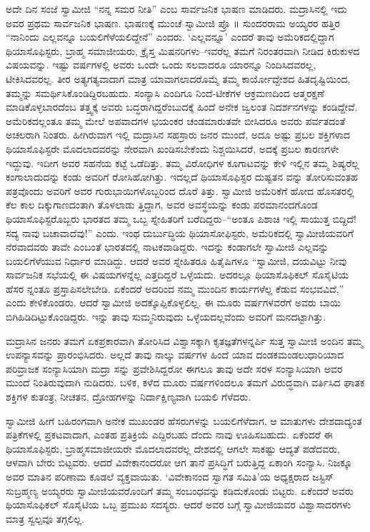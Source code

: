 ಅದೇ ದಿನ ಸಂಜೆ ಸ್ವಾಮೀಜಿ “ನನ್ನ ಸಮರ ನೀತಿ” ಎಂಬ ಸಾರ್ವಜನಿಕ ಭಾಷಣ ಮಾಡಿದರು. ಮದ್ರಾಸಿನಲ್ಲಿ ಇದು ಅವರ ಪ್ರಥಮ ಸಾರ್ವಜನಿಕ ಭಾಷಣ. ಭಾಷಣಕ್ಕೆ ಮುಂಚೆ ಸ್ವಾಮೀಜಿ ಪ್ರೊ ॥ ಸುಂದರರಾಮ ಅಯ್ಯರರ ಹತ್ತಿರ “ನಾನಿಂದು ಎಲ್ಲವನ್ನೂ ಬಯಲಿಗೆಳೆಯಲಿದ್ದೇನೆ” ಎಂದರು. ‘ಎಲ್ಲವನ್ನೂ’ ಎಂದರೆ ತಾವು ಅಮೆರಿಕದಲ್ಲಿದ್ದಾಗ ಥಿಯಾಸೊಫಿಸ್ಟರು, ಬ್ರಾಹ್ಮ ಸಮಾಜೀಯರು, ಕ್ರೈಸ್ತ ಮಿಷನರಿಗಳು–ಇವರೆಲ್ಲ ತಮಗೆ ನಿರಂತರವಾಗಿ ನೀಡಿದ ಕಿರುಕುಳದ ವಿಷಯವನ್ನು. ಇಷ್ಟು ವರ್ಷಗಳಲ್ಲಿ ಅವರು ಒಂದೇ ಒಂದು ಸಲವಾದರೂ ಯಾರನ್ನೂ ನಿಂದಿಸಿದವರಲ್ಲ, ಟೀಕಿಸಿದವರಲ್ಲ. ತೀರ ಅತ್ಯಗತ್ಯವಾದಾಗ ಮಾತ್ರ ಯಾವಾಗಲಾದರೊಮ್ಮೆ ತಮ್ಮ ಕಾರ್ಯೋದ್ದೇಶದ ಹಿತದೃಷ್ಟಿಯಿಂದ, ತಮ್ಮನ್ನು ಸಮರ್ಥಿಸಿಕೊಂಡಿದ್ದಿರಬಹುದು. ಸಂನ್ಯಾಸಿ ಎಂದಿಗೂ ನಿಂದೆ-ಟೀಕೆಗಳ ಆಕ್ರಮಣದಿಂದ ಆತ್ಮರಕ್ಷಣೆ ಮಾಡಿಕೊಳ್ಳಬಾರದೆಂಬ ತತ್ತ್ವಕ್ಕೆ ಅವರು ಬದ್ಧರಾಗಿದ್ದರೆಂಬುದಕ್ಕೆ ಹಿಂದೆ ಅನೇಕ ಜ್ವಲಂತ ನಿದರ್ಶನಗಳನ್ನು ಕಂಡಿದ್ದೇವೆ. ಅಮೆರಿಕದಲ್ಲಂತೂ ತಮ್ಮ ಮೇಲೆ ಅಪವಾದಗಳ ಭಯಂಕರ ಚಂಡಮಾರುತವೇ ಬೀಸಿದರೂ ಅವರು ಪರ್ವತದಂತೆ ಅಚಲರಾಗಿ ನಿಂತರು. ಹೀಗಿರುವಾಗ ಇಲ್ಲಿ ಮದ್ರಾಸಿನ ಸಹಸ್ರಾರು ಜನರ ಮುಂದೆ, ಅದೂ ಅಷ್ಟು ಪ್ರಬಲ ಶಕ್ತಿಗಳಾದ ಥಿಯಾಸೊಫಿಸ್ಟರೇ ಮೊದಲಾದವರನ್ನು ನೇರವಾಗಿ ಖಂಡಿಸಬೇಕೆಂದು ನಿಶ್ಚಯಿಸಿದರೆ, ಅದಕ್ಕೆ ಪ್ರಬಲ ಕಾರಣಗಳೇ ಇದ್ದುವು. ಇದೀಗ ಅವರ ಸಹನೆಯ ಕಟ್ಟೆ ಒಡೆದಿತ್ತು. ತಮ್ಮ ವಿರೋಧಿಗಳ ಕೂಗಾಟವನ್ನು ಕೇಳಿ ಇಲ್ಲಿನ ತಮ್ಮ ಶಿಷ್ಯರೆಲ್ಲ ಕಂಗಾಲಾದುದನ್ನು ಕಂಡು ಅವರಿಗೆ ರೋಸಿಹೋಗಿತ್ತು. ಇದಲ್ಲದೆ ಥಿಯಾಸೊಫಿಸ್ಟರ ದುಷ್ಟತನ ವನ್ನು ತೋರಿಸುವಂತಹ ಪತ್ರವೊಂದು ಅವರಿಗೆ ಅವರ ಗುರುಭಾಯಿಗಳೊಬ್ಬರಿಂದ ದೊರೆ ತಿತ್ತು. ಸ್ವಾಮೀಜಿ ಅಮೆರಿಕೆಗೆ ಹೋದ ಹೊಸತರಲ್ಲಿ ಕೆಲ ಕಾಲ ದಿಕ್ಕುಗಾಣದಂತಾಗಿ ತೊಳಲಾಡು ತ್ತಿದ್ದಾಗ, ಅವರ ಅವಸ್ಥೆಯನ್ನು ಕಂಡು ಪರಮಾನಂದಗೊಂಡ ಥಿಯಾಸೊಫಿಸ್ಟರೊಬ್ಬರು ಭಾರತದ ತಮ್ಮ ಒಬ್ಬ ಸ್ನೇಹಿತರಿಗೆ ಬರೆದಿದ್ದರು–“ಅಂತೂ ಪಿಶಾಚಿ ಇಲ್ಲಿ ಸಾಯುತ್ತ ಬಿದ್ದಿದೆ! ಸದ್ಯ ನಾವು ಬಚಾವಾದೆವು!” ಎಂದು. ಇಂಥ ದುರ್ಬುದ್ಧಿಯ ಥಿಯಾಸೋಫಿಸ್ಟರು, ಅಮೆರಿಕದಲ್ಲಿ ಸ್ವಾಮೀಜಿಯವರಿಗೆ ನೆರವಾದವರು ತಾವೇ ಎಂಬಂತೆ ಭಾರತದಲ್ಲಿ ನಾಟಕವಾಡಿದ್ದರು. ಇದನ್ನು ಕಂಡಾಗಲೇ ಸ್ವಾಮೀಜಿ ಎಲ್ಲವನ್ನು ಬಯಲಿಗೆಳೆಯುವ ನಿರ್ಧಾರ ಮಾಡಿದ್ದು. ಆದರೆ ಅವರ ಸ್ನೇಹಿತರೂ ಹಿತೈಷಿಗಳೂ “ಸ್ವಾಮೀಜಿ, ದಯವಿಟ್ಟು ನೀವು ಸಾರ್ವಜನಿಕ ಸಭೆಯಲ್ಲಿ ಈ ವಿಷಯಗಳನ್ನೆಲ್ಲ ಎತ್ತದಿದ್ದರೆ ಒಳ್ಳೆಯದು. ಅದರಲ್ಲೂ ಥಿಯಾಸೊಫಿಕಲ್ ಸೊಸೈಟಿಯ ಹೆಸರ ನ್ನಂತೂ ಪ್ರಸ್ತಾಪಿಸಲೇಬೇಡಿ. ಏಕೆಂದರೆ ಅದರಿಂದ ನಮ್ಮ ಮುಂದಿನ ಕಾರ್ಯಗಳೆಲ್ಲ ಕೆಡುವ ಸಂಭವವಿದೆ,” ಎಂದು ಕೇಳಿಕೊಂಡರು. ಆದರೆ ಸ್ವಾಮೀಜಿ ಅದಕ್ಕೊಪ್ಪಿಕೊಳ್ಳಲಿಲ್ಲ. ಈ ಮೂರು ವರ್ಷಗಳವರೆಗೆ ಅವರು ಬಾಯಿ ಬಿಗಿಹಿಡಿದಿಟ್ಟುಕೊಂಡಿದ್ದರು. ಇನ್ನು ತಾವು ಸುಮ್ಮನಿರುವುದು ಒಳ್ಳೆಯದಲ್ಲವೆಂದು ಅವರಿಗೆ ಮನದಟ್ಟಾಗಿತ್ತು.

ಮದ್ರಾಸಿನ ಜನರು ತಮಗೆ ಏಕಪ್ರಕಾರವಾಗಿ ತೋರಿಸಿದ ವಿಶ್ವಾಸಕ್ಕಾಗಿ ಕೃತಜ್ಞತೆಗಳನ್ನರ್ಪಿ ಸುತ್ತ ಸ್ವಾಮೀಜಿ ಅಂದಿನ ತಮ್ಮ ಉಪನ್ಯಾಸವನ್ನು ಪ್ರಾರಂಭಿಸಿದರು. ಅಲ್ಲದೆ ತಾವು ನಾಲ್ಕು ವರ್ಷಗಳ ಹಿಂದೆ ಯಾವ ದಂಡಕಮಂಡಲುಧಾರಿಯಾದ ಪರಿವ್ರಾಜಕ ಸಂನ್ಯಾಸಿಯಾಗಿ ಮದ್ರಾ ಸನ್ನು ಪ್ರವೇಶಿಸಿದ್ದರೋ ಈಗಲೂ ತಾವು ಅದೇ ಸರಳ ಸಂನ್ಯಾಸಿಯಾಗಿ ಅವರ ಮುಂದೆ ನಿಂತಿರುವುದಾಗಿ ನುಡಿದರು. ಬಳಿಕ, ಕಳೆದ ಮೂರು ವರ್ಷಗಳಿಂದಲೂ ತಮಗೆ ವಿರುದ್ಧವಾಗಿ ವರ್ತಿಸಿದ ಘಾತಕ ಶಕ್ತಿಗಳ ಕುತಂತ್ರ, ನೀಚತನ, ದ್ರೋಹಗಳನ್ನು ನಿರ್ದಾಕ್ಷಿಣ್ಯವಾಗಿ ಬಯಲಿ ಗೆಳೆದರು.

ಸ್ವಾಮೀಜಿ ಹೀಗೆ ಬಹಿರಂಗವಾಗಿ ಅನೇಕ ಮುಖಂಡರ ಹೆಸರುಗಳನ್ನು ಬಯಲಿಗೆಳೆದಾಗ, ಆ ಮಾತುಗಳು ದೇಶದಾದ್ಯಂತ ಪತ್ರಿಕೆಗಳಲ್ಲಿ ಪ್ರಕಟವಾದಾಗ, ಎಂತಹ ಪ್ರತಿಕ್ರಿಯೆ ಎದ್ದಿರಬಹು ದೆಂದು ನಾವು ಊಹಿಸಬಹುದು. ಏಕೆಂದರೆ ಈ ಥಿಯಾಸೊಫಿಸ್ಟರು, ಬ್ರಾಹ್ಮಸಮಾಜೀಯರೇ ಮೊದಲಾದವರೆಲ್ಲ ದೇಶದಲ್ಲಿ ಆಗಲೇ ಸಾಕಷ್ಟು ಆದ್ಯತೆ ಪಡೆದವರು, ಆಳವಾಗಿ ಬೇರು ಬಿಟ್ಟವರು. ಆದರೆ ವಿವೇಕಾನಂದರೋ ಆಗ ತಾನೆ ಪ್ರಸಿದ್ಧಿಗೆ ಬರುತ್ತಿದ್ದ ಏಕಾಂಗಿ ಸಂನ್ಯಾಸಿ. ನಿಜಕ್ಕೂ ಅವರ ಮಾತಿನ ಪರಿಣಾಮ ಕೂಡಲೆ ವ್ಯಕ್ತವಾಯಿತು. ‘ವಿವೇಕಾನಂದ ಸ್ವಾಗತ ಸಮಿತಿ’ಯ ಅಧ್ಯಕ್ಷರಾದ ಜಸ್ಟಿಸ್ ಸುಬ್ರಹ್ಮಣ್ಯ ಅಯ್ಯರರು ಸ್ವಾಮೀಜಿಯವರೊಂದಿಗೆ ತಮ್ಮ ಸಂಬಂಧವನ್ನು ಕಡಿದುಕೊಂಡು ಬಿಟ್ಟರು. ಏಕೆಂದರೆ ಅವರು ಥಿಯಾಸೊಫಿಕಲ್ ಸೊಸೈಟಿಯ ಒಬ್ಬ ಪ್ರಮುಖ ಸದಸ್ಯರು. ಆದರೆ ಅವರ ಬಗ್ಗೆ ಸ್ವಾಮೀಜಿಯವರ ವಿಶ್ವಾಸಾದರಗಳು ಮಾತ್ರ ಸ್ವಲ್ಪವೂ ತಗ್ಗಲಿಲ್ಲ.

